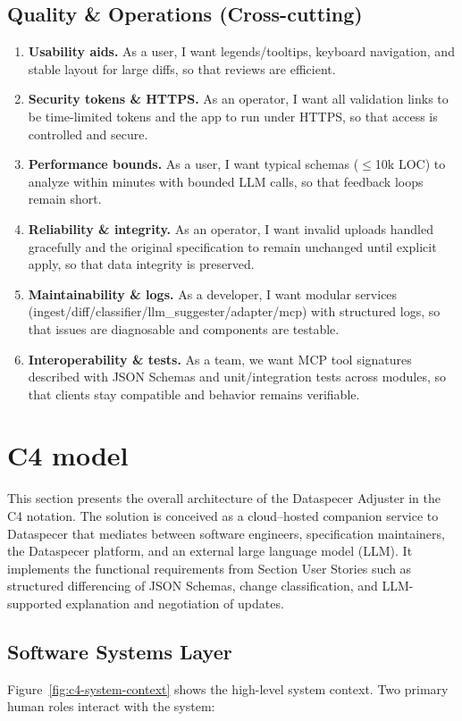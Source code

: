 \subsection*{Quality \& Operations (Cross-cutting)}
\begin{enumerate}
  \item \textbf{Usability aids.} As a user, I want legends/tooltips, keyboard navigation, and stable layout for large diffs, so that reviews are efficient. 
  \item \textbf{Security tokens \& HTTPS.} As an operator, I want all validation links to be time-limited tokens and the app to run under HTTPS, so that access is controlled and secure. 
  \item \textbf{Performance bounds.} As a user, I want typical schemas (\(\leq\)10k LOC) to analyze within minutes with bounded LLM calls, so that feedback loops remain short. 
  \item \textbf{Reliability \& integrity.} As an operator, I want invalid uploads handled gracefully and the original specification to remain unchanged until explicit apply, so that data integrity is preserved. 
  \item \textbf{Maintainability \& logs.} As a developer, I want modular services (ingest/diff/classifier/llm\_suggester/adapter/mcp) with structured logs, so that issues are diagnosable and components are testable. 
  \item \textbf{Interoperability \& tests.} As a team, we want MCP tool signatures described with JSON Schemas and unit/integration tests across modules, so that clients stay compatible and behavior remains verifiable. 
\end{enumerate}


\section{C4 model}
This section presents the overall architecture of the Dataspecer Adjuster in the
C4 notation. The solution is conceived as a cloud–hosted companion service to
Dataspecer that mediates between software engineers, specification maintainers,
the Dataspecer platform, and an external large language model (LLM). It
implements the functional requirements from Section User Stories such as
structured differencing of JSON Schemas, change classification, and
LLM-supported explanation and negotiation of updates.
\subsection{Software Systems Layer}
Figure~\ref{fig:c4-system-context} shows the high-level system context. Two
primary human roles interact with the system:

